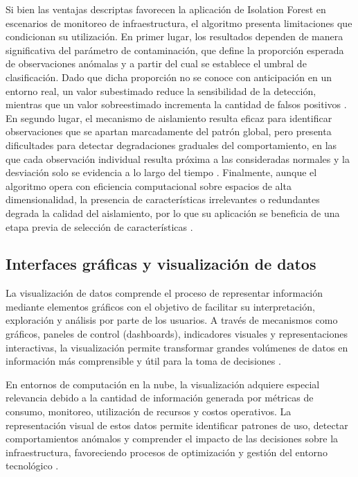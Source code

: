 Si bien las ventajas descriptas favorecen la aplicación de Isolation Forest en escenarios de monitoreo de infraestructura, el algoritmo presenta limitaciones que condicionan su utilización. En primer lugar, los resultados dependen de manera significativa del parámetro de contaminación, que define la proporción esperada de observaciones anómalas y a partir del cual se establece el umbral de clasificación. Dado que dicha proporción no se conoce con anticipación en un entorno real, un valor subestimado reduce la sensibilidad de la detección, mientras que un valor sobreestimado incrementa la cantidad de falsos positivos \parencite{Liu2008}. En segundo lugar, el mecanismo de aislamiento resulta eficaz para identificar observaciones que se apartan marcadamente del patrón global, pero presenta dificultades para detectar degradaciones graduales del comportamiento, en las que cada observación individual resulta próxima a las consideradas normales y la desviación solo se evidencia a lo largo del tiempo \parencite{Natterdal2024}. Finalmente, aunque el algoritmo opera con eficiencia computacional sobre espacios de alta dimensionalidad, la presencia de características irrelevantes o redundantes degrada la calidad del aislamiento, por lo que su aplicación se beneficia de una etapa previa de selección de características \parencite{Zou2022}.

\subsection{Interfaces gráficas y visualización de datos}

La visualización de datos comprende el proceso de representar información mediante elementos gráficos con el objetivo de facilitar su interpretación, exploración y análisis por parte de los usuarios. A través de mecanismos como gráficos, paneles de control (dashboards), indicadores visuales y representaciones interactivas, la visualización permite transformar grandes volúmenes de datos en información más comprensible y útil para la toma de decisiones \parencite{Munzner2014}.

En entornos de computación en la nube, la visualización adquiere especial relevancia debido a la cantidad de información generada por métricas de consumo, monitoreo, utilización de recursos y costos operativos. La representación visual de estos datos permite identificar patrones de uso, detectar comportamientos anómalos y comprender el impacto de las decisiones sobre la infraestructura, favoreciendo procesos de optimización y gestión del entorno tecnológico \parencite{Munzner2014}.

